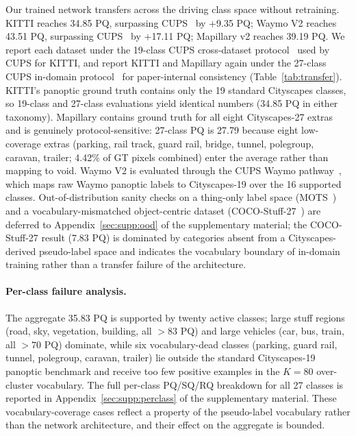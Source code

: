 \documentclass{article}
\begin{document}
Our trained network transfers across the driving class space without retraining. KITTI reaches 34.85 PQ, surpassing CUPS~\cite{hahn2025cups} by $+$9.35 PQ; Waymo V2 reaches 43.51 PQ, surpassing CUPS~\cite{hahn2025cups} by $+$17.11 PQ; Mapillary v2 reaches 39.19 PQ. We report each dataset under the 19-class CUPS cross-dataset protocol~\cite{hahn2025cups} used by CUPS for KITTI, and report KITTI and Mapillary again under the 27-class CUPS in-domain protocol~\cite{hahn2025cups} for paper-internal consistency (Table~\ref{tab:transfer}). KITTI's panoptic ground truth contains only the 19 standard Cityscapes classes, so 19-class and 27-class evaluations yield identical numbers (34.85 PQ in either taxonomy). Mapillary contains ground truth for all eight Cityscapes-27 extras and is genuinely protocol-sensitive: 27-class PQ is 27.79 because eight low-coverage extras (parking, rail track, guard rail, bridge, tunnel, polegroup, caravan, trailer; 4.42\% of GT pixels combined) enter the average rather than mapping to void. Waymo V2 is evaluated through the CUPS Waymo pathway~\cite{hahn2025cups}, which maps raw Waymo panoptic labels to Cityscapes-19 over the 16 supported classes. Out-of-distribution sanity checks on a thing-only label space (MOTS~\cite{voigtlaender2019mots}) and a vocabulary-mismatched object-centric dataset (COCO-Stuff-27~\cite{caesar2018coco}) are deferred to Appendix~\ref{sec:supp:ood} of the supplementary material; the COCO-Stuff-27 result (7.83 PQ) is dominated by categories absent from a Cityscapes-derived pseudo-label space and indicates the vocabulary boundary of in-domain training rather than a transfer failure of the architecture.

\paragraph{Per-class failure analysis.}
The aggregate 35.83 PQ is supported by twenty active classes; large stuff regions (road, sky, vegetation, building, all $>83$ PQ) and large vehicles (car, bus, train, all $>70$ PQ) dominate, while six vocabulary-dead classes (parking, guard rail, tunnel, polegroup, caravan, trailer) lie outside the standard Cityscapes-19 panoptic benchmark and receive too few positive examples in the $K{=}80$ over-cluster vocabulary. The full per-class PQ/SQ/RQ breakdown for all 27 classes is reported in Appendix~\ref{sec:supp:perclass} of the supplementary material. These vocabulary-coverage cases reflect a property of the pseudo-label vocabulary rather than the network architecture, and their effect on the aggregate is bounded.
\end{document}
